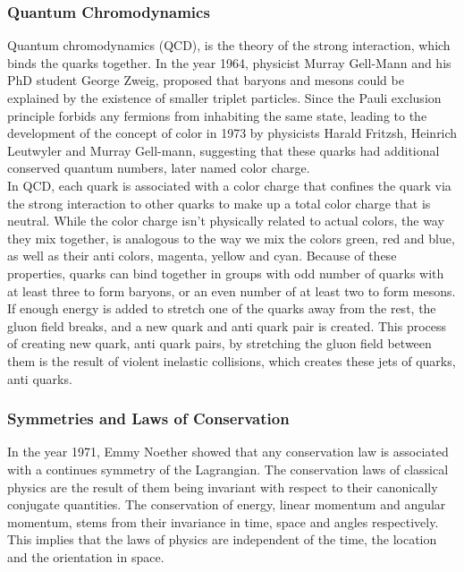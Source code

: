 \documentclass[12pt,a4paper]{article}
\numberwithin{equation}{section}
\begin{document}
\subsubsection{Quantum Chromodynamics}
Quantum chromodynamics (QCD), is the theory of the strong interaction, which
binds the quarks together. In the year 1964, physicist Murray Gell-Mann and his
PhD student George Zweig, proposed that baryons and mesons could be explained by
the existence of smaller triplet particles\cite{GELLMANN1964214}. Since the
Pauli exclusion principle forbids any fermions from inhabiting the same state,
leading to the development of the concept of color in 1973\cite{FRITZSCH1973365}
by physicists Harald Fritzsh, Heinrich Leutwyler and Murray Gell-mann,
suggesting that these quarks had additional conserved
quantum numbers, later named color charge.\\

In QCD, each quark is associated with a color charge that confines the quark via
the strong interaction to other quarks to make up a total color charge that is
neutral. While the color charge isn't physically related to actual colors, the
way they mix together, is analogous to the way we mix the colors green, red and
blue, as well as their anti colors, magenta, yellow and cyan. Because of these
properties, quarks can bind together in groups with odd number of quarks with
at least three to form baryons, or an even number of at least two to form mesons.\\

If enough energy is added to stretch one of the quarks away from the rest, the
gluon field breaks, and a new quark and anti quark pair is created. This process
of creating new quark, anti quark pairs, by stretching the gluon field between
them is the result of violent inelastic collisions, which creates these jets of
quarks, anti quarks.\\

\subsubsection{Symmetries and Laws of Conservation}
In the year 1971, Emmy Noether showed that any conservation law is associated
with a continues symmetry of the Lagrangian\cite{Noether_1971}. The
conservation laws of classical physics are the result of them being invariant
with respect to their canonically conjugate quantities. The conservation of
energy, linear momentum and angular momentum, stems from their invariance in
time, space and angles respectively. This implies that the laws of physics are
independent of the time, the location and the orientation in space.\\
\end{document}
